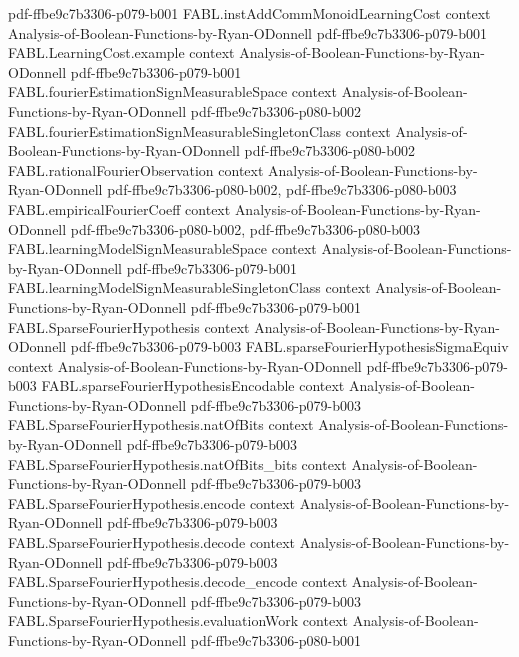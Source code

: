 \begin{theorem}
  {pdf-ffbe9c7b3306-p079-b001}
\proofstep
  {FABL.instAddCommMonoidLearningCost}
  {context}
  {Analysis-of-Boolean-Functions-by-Ryan-ODonnell}
  {pdf-ffbe9c7b3306-p079-b001}
\proofstep
  {FABL.LearningCost.example}
  {context}
  {Analysis-of-Boolean-Functions-by-Ryan-ODonnell}
  {pdf-ffbe9c7b3306-p079-b001}
\proofstep
  {FABL.fourierEstimationSignMeasurableSpace}
  {context}
  {Analysis-of-Boolean-Functions-by-Ryan-ODonnell}
  {pdf-ffbe9c7b3306-p080-b002}
\proofstep
  {FABL.fourierEstimationSignMeasurableSingletonClass}
  {context}
  {Analysis-of-Boolean-Functions-by-Ryan-ODonnell}
  {pdf-ffbe9c7b3306-p080-b002}
\proofstep
  {FABL.rationalFourierObservation}
  {context}
  {Analysis-of-Boolean-Functions-by-Ryan-ODonnell}
  {pdf-ffbe9c7b3306-p080-b002,
    pdf-ffbe9c7b3306-p080-b003}
\proofstep
  {FABL.empiricalFourierCoeff}
  {context}
  {Analysis-of-Boolean-Functions-by-Ryan-ODonnell}
  {pdf-ffbe9c7b3306-p080-b002,
    pdf-ffbe9c7b3306-p080-b003}
\proofstep
  {FABL.learningModelSignMeasurableSpace}
  {context}
  {Analysis-of-Boolean-Functions-by-Ryan-ODonnell}
  {pdf-ffbe9c7b3306-p079-b001}
\proofstep
  {FABL.learningModelSignMeasurableSingletonClass}
  {context}
  {Analysis-of-Boolean-Functions-by-Ryan-ODonnell}
  {pdf-ffbe9c7b3306-p079-b001}
\proofstep
  {FABL.SparseFourierHypothesis}
  {context}
  {Analysis-of-Boolean-Functions-by-Ryan-ODonnell}
  {pdf-ffbe9c7b3306-p079-b003}
\proofstep
  {FABL.sparseFourierHypothesisSigmaEquiv}
  {context}
  {Analysis-of-Boolean-Functions-by-Ryan-ODonnell}
  {pdf-ffbe9c7b3306-p079-b003}
\proofstep
  {FABL.sparseFourierHypothesisEncodable}
  {context}
  {Analysis-of-Boolean-Functions-by-Ryan-ODonnell}
  {pdf-ffbe9c7b3306-p079-b003}
\proofstep
  {FABL.SparseFourierHypothesis.natOfBits}
  {context}
  {Analysis-of-Boolean-Functions-by-Ryan-ODonnell}
  {pdf-ffbe9c7b3306-p079-b003}
\proofstep
  {FABL.SparseFourierHypothesis.natOfBits_bits}
  {context}
  {Analysis-of-Boolean-Functions-by-Ryan-ODonnell}
  {pdf-ffbe9c7b3306-p079-b003}
\proofstep
  {FABL.SparseFourierHypothesis.encode}
  {context}
  {Analysis-of-Boolean-Functions-by-Ryan-ODonnell}
  {pdf-ffbe9c7b3306-p079-b003}
\proofstep
  {FABL.SparseFourierHypothesis.decode}
  {context}
  {Analysis-of-Boolean-Functions-by-Ryan-ODonnell}
  {pdf-ffbe9c7b3306-p079-b003}
\proofstep
  {FABL.SparseFourierHypothesis.decode_encode}
  {context}
  {Analysis-of-Boolean-Functions-by-Ryan-ODonnell}
  {pdf-ffbe9c7b3306-p079-b003}
\proofstep
  {FABL.SparseFourierHypothesis.evaluationWork}
  {context}
  {Analysis-of-Boolean-Functions-by-Ryan-ODonnell}
  {pdf-ffbe9c7b3306-p080-b001}
\proofstep

\end{theorem}
